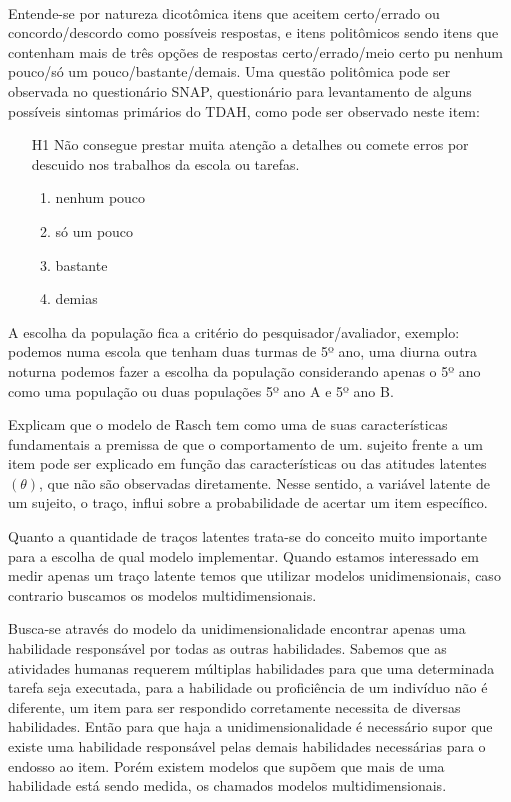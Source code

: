     \paragraph{}
    	Entende-se por natureza dicotômica itens que aceitem certo/errado ou concordo/descordo como possíveis respostas, e itens politômicos sendo itens que contenham mais de três opções de respostas certo/errado/meio certo pu nenhum pouco/só um pouco/bastante/demais. Uma questão politômica pode ser observada no questionário  SNAP, questionário  para levantamento de alguns  possíveis  sintomas  primários  do  TDAH, como pode ser observado neste item:
    \newpage
	\begin{enumerate}
	    \item[H1] Não consegue prestar muita atenção a detalhes ou comete erros por descuido nos trabalhos da escola ou tarefas.
	    \begin{enumerate}
	        \item nenhum pouco
	        \item só um pouco
	        \item bastante
	        \item demias
	    \end{enumerate}
	\end{enumerate}
\par
	    A escolha da população fica a critério do pesquisador/avaliador, exemplo: podemos numa escola que tenham duas turmas de 5º ano, uma diurna outra noturna podemos fazer a escolha da população considerando apenas o 5º ano como uma população ou duas populações 5º ano A e 5º ano B. %
	\par
    	Explicam que o modelo de Rasch tem como uma de suas características fundamentais a premissa de que o comportamento de um. sujeito frente a um item pode ser explicado em função das características ou das atitudes
    	latentes $(\theta)$, que não são observadas diretamente. Nesse sentido, a variável latente de um
    	sujeito, o traço, influi sobre a probabilidade de acertar um item específico.
	 \par
	 	Quanto a quantidade de traços latentes trata-se do conceito muito importante para a escolha de qual modelo implementar. Quando estamos interessado em medir apenas um traço latente temos que utilizar modelos unidimensionais, caso contrario buscamos os modelos multidimensionais.
	 \par 
	    Busca-se através do modelo da unidimensionalidade encontrar apenas uma habilidade responsável por todas as outras habilidades. Sabemos que as atividades humanas requerem múltiplas habilidades para que uma determinada tarefa seja executada,  para a habilidade ou proficiência de um indivíduo não é diferente, um item para ser respondido corretamente necessita de diversas habilidades. Então para que haja a unidimensionalidade é necessário supor que existe uma habilidade responsável pelas demais habilidades necessárias para o endosso ao item. Porém existem modelos que supõem que mais de uma habilidade está sendo medida, os chamados modelos multidimensionais.
